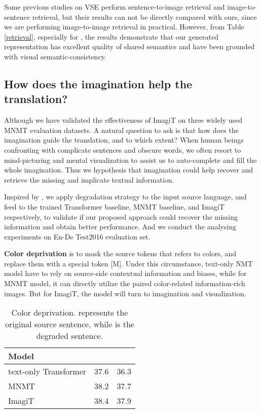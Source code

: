 \documentclass[11pt]{article}
\newcommand{\method}{ImagiT\xspace}
\begin{document}
Some previous studies on VSE perform sentence-to-image retrieval and image-to-sentence retrieval, but their results can not be directly compared with ours, since we are performing image-to-image retrieval in practical. However, from Table \ref{retrieval}, especially for , the results demonstrate that our generated representation has excellent quality of shared semantics and have been grounded with visual semantic-consistency. 

\subsection{How does the imagination help the translation?}

Although we have validated the effectiveness of \method on three widely used MNMT evaluation datasets. A natural question to ask is that how does the imagination guide the translation, and to which extent? When human beings confronting with complicate sentences and obscure words, we often resort to mind-picturing and mental visualization to assist us to auto-complete and fill the whole imagination. Thus we hypothesis that imagination could help recover and retrieve the missing and implicate textual information.

Inspired by \citet{ive2019distilling,caglayan2019probing}, we apply degradation strategy to the input source language, and feed to the trained Transformer baseline, MNMT baseline, and \method respectively, to validate if our proposed approach could recover the missing information and obtain better performance. And we conduct the analysing experiments on En-De Test2016 evaluation set.

\textbf{Color deprivation} is to mask the source tokens that refers to colors, and replace them with a special token [M]. Under this circumstance, text-only NMT model have to rely on source-side contextual information and biases, while for MNMT model, it can directly utilize the paired color-related information-rich images. But for \method, the model will turn to imagination and visualization.

\begin{table}[!h]
\centering
\begin{tabular}{l|cc}
\hline
 Model             &      &     \\ \hline
text-only Transformer & 37.6  & 36.3 \\ \hline
MNMT        & 38.2 & 37.7 \\ \hline
\method       & 38.4 & 37.9 \\
\hline
\end{tabular}
\caption{Color deprivation.  represents the original source sentence, while  is the degraded sentence.}
\label{color deprivation}
\end{table}
\end{document}
